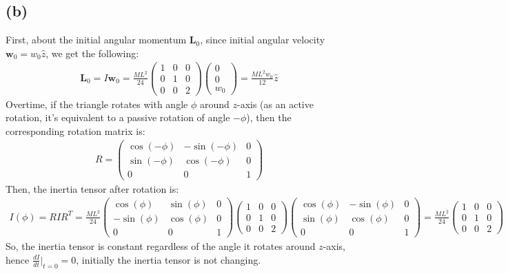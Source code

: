 \documentclass{article}
\begin{document}
\subsection*{(b)}
First, about the initial angular momentum $\textbf{L}_0$, since initial angular velocity $\textbf{w}_0 = w_0\hat{z}$, we get the following:
\begin{align}
    \textbf{L}_0 = I\textbf{w}_0 = \frac{ML^2}{24}\begin{pmatrix}
        1&0&0\\0&1&0\\0&0&2
    \end{pmatrix} \begin{pmatrix}
        0\\0\\w_0
    \end{pmatrix} = \frac{ML^2w_0}{12}\hat{z}
\end{align}
Overtime, if the triangle rotates with angle $\phi$ around $z$-axis (as an active rotation, it's equivalent to a passive rotation of angle $-\phi$), then the corresponding rotation matrix is:
\begin{align}
    R = \begin{pmatrix}
        \cos(-\phi) & -\sin(-\phi)&0\\
        \sin(-\phi) & \cos(-\phi)& 0\\
        0&0&1
    \end{pmatrix}
\end{align}
Then, the inertia tensor after rotation is:
\begin{align}
    I(\phi) = RIR^T = \frac{ML^2}{24}\begin{pmatrix}
        \cos(\phi) & \sin(\phi)&0\\
        -\sin(\phi) & \cos(\phi)& 0\\
        0&0&1
    \end{pmatrix}\begin{pmatrix}
        1&0&0\\0&1&0\\0&0&2
    \end{pmatrix}\begin{pmatrix}
        \cos(\phi) & -\sin(\phi)&0\\
        \sin(\phi) & \cos(\phi)& 0\\
        0&0&1
    \end{pmatrix}= \frac{ML^2}{24}\begin{pmatrix}
        1&0&0\\0&1&0\\0&0&2
    \end{pmatrix}
\end{align}
So, the inertia tensor is constant regardless of the angle it rotates around $z$-axis, hence $\frac{dI}{dt}\bigg|_{t=0}=0$, initially the inertia tensor is not changing.
\end{document}

